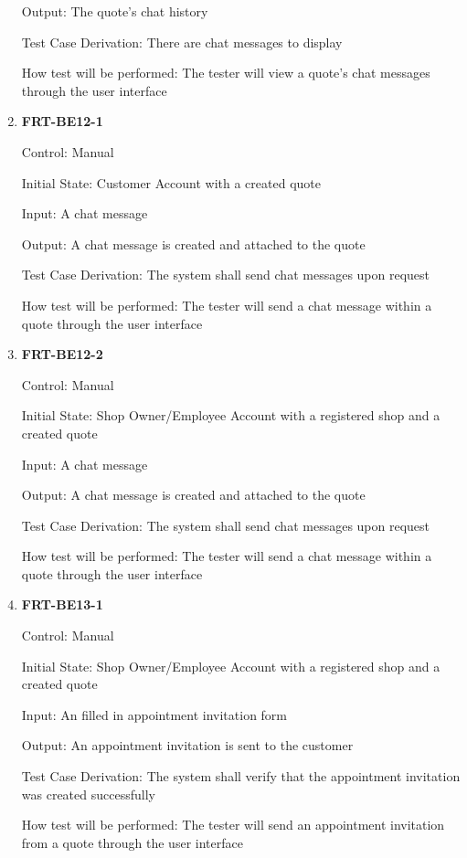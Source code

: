 \documentclass[12pt, titlepage]{article}
\begin{document}
\begin{enumerate}
	      Output: The quote's chat history

	      Test Case Derivation: There are chat messages to display

	      How test will be performed: The tester will view a quote's chat messages through the user interface

	\item \textbf{FRT-BE12-1}

	      Control: Manual

	      Initial State: Customer Account with a created quote

	      Input: A chat message

	      Output: A chat message is created and attached to the quote

	      Test Case Derivation: The system shall send chat messages upon request

	      How test will be performed: The tester will send a chat message within a quote through the user
	      interface

	\item \textbf{FRT-BE12-2}

	      Control: Manual

	      Initial State: Shop Owner/Employee Account with a registered shop and a created quote

	      Input: A chat message

	      Output: A chat message is created and attached to the quote

	      Test Case Derivation: The system shall send chat messages upon request

	      How test will be performed: The tester will send a chat message within a quote through the user
	      interface

	\item \textbf{FRT-BE13-1}

	      Control: Manual

	      Initial State: Shop Owner/Employee Account with a registered shop and a created quote

	      Input: An filled in appointment invitation form

	      Output: An appointment invitation is sent to the customer

	      Test Case Derivation: The system shall verify that the appointment invitation was created
	      successfully

	      How test will be performed: The tester will send an appointment invitation from a quote through the
	      user interface


\end{enumerate}
\end{document}
